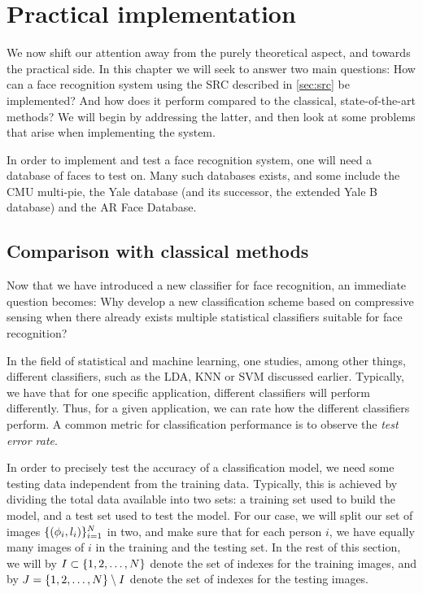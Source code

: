 \chapter{Practical implementation}
We now shift our attention away from the purely theoretical aspect, and towards the practical side. In this chapter we will seek to answer two main questions: How can a face recognition system using the SRC described in \cref{sec:src} be implemented? And how does it perform compared to the classical, state-of-the-art methods? We will begin by addressing the latter, and then look at some problems that arise when implementing the system.

In order to implement and test a face recognition system, one will need a database of faces to test on. Many such databases exists, and some include the CMU multi-pie, the Yale database (and its successor, the extended Yale B database) and the AR Face Database. 


\section{Comparison with classical methods}
Now that we have introduced a new classifier for face recognition, an immediate question becomes: Why develop a new classification scheme based on compressive sensing when there already exists multiple statistical classifiers suitable for face recognition? 

In the field of statistical and machine learning, one studies, among other things, different classifiers, such as the LDA, KNN or SVM discussed earlier. Typically, we have that for one specific application, different classifiers will perform differently. Thus, for a given application, we can rate how the different classifiers perform. A common metric for classification performance is to observe the \textit{test error rate}.

In order to precisely test the accuracy of a classification model, we need some testing data independent from the training data. Typically, this is achieved by dividing the total data available into two sets: a training set used to build the model, and a test set used to test the model. For our case, we will split our set of images $ \{(\phi_{i}, l_{i})\}_{i=1}^{N} $ in two, and make sure that for each person $ i $, we have equally many images of $ i $ in the training and the testing set. In the rest of this section, we will by $ I \subset \{1, 2, \ldots, N\} $ denote the set of indexes for the training images, and by $ J = \{1, 2, \ldots, N\} \setminus I $ denote the set of indexes for the testing images. 

